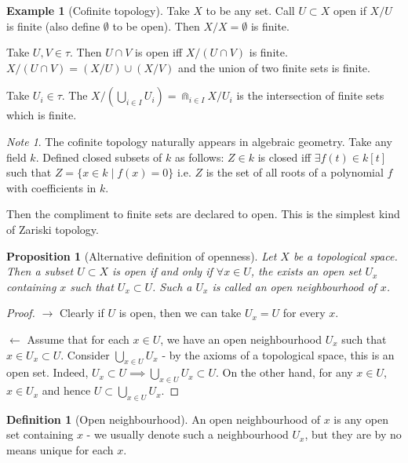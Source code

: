 \documentclass{article}
\theoremstyle{definition}
\newtheorem{defn}{Definition}[section]
\newtheorem{exmp}{Example}[section]
\theoremstyle{plain}%
\newtheorem{prop}[thm]{Proposition}
\theoremstyle{remark}
\newtheorem*{note}{Note}
\newcommand{\union}{\cup}
\newcommand{\Union}{\bigcup}
\begin{document}
\begin{exmp}[Cofinite topology]
Take $X$ to be any set. Call $U \subset X$ open if $X / U$ is finite (also define $\emptyset$ to be open). Then $X / X = \emptyset$ is finite. 

Take $U, V \in \tau$. Then $U \cap V$ is open iff $X / (U \cap V)$ is finite. $X / (U \cap V) = (X / U) \union (X / V)$ and the union of two finite sets is finite.

Take $U_i \in \tau$. The $X / (\Union_{i \in I} U_i) = \Cap_{i \in I} X / U_i$ is the intersection of finite sets which is finite.
\end{exmp}

\begin{note}
The cofinite topology naturally appears in algebraic geometry. Take any field $k$. Defined closed subsets of $k$ as follows: $Z \in k$ is closed iff $\exists f(t) \in k[t]$ such that $Z = \{x \in k \; | \; f(x) = 0\}$ i.e. $Z$ is the set of all roots of a polynomial $f$ with coefficients in $k$.

Then the compliment to finite sets are declared to open. This is the simplest kind of Zariski topology.
\end{note}

\begin{prop}[Alternative definition of openness]\label{open by open neighbourhoods}
Let $X$ be a topological space. Then a subset $U \subset X$ is open if and only if $\forall x \in U$, the exists an open set $U_x$ containing $x$ such that $U_x \subset U$. Such a $U_x$ is called an open neighbourhood of $x$.
\end{prop}

\begin{proof}
$\rightarrow$ Clearly if $U$ is open, then we can take $U_x = U$ for every $x$.

$\leftarrow$ Assume that for each $x \in U$, we have an open neighbourhood $U_x$ such that $x \in U_x \subset U$. Consider $\Union_{x \in U}U_x$ - by the axioms of a topological space, this is an open set. Indeed, $U_x \subset U \implies \Union_{x \in U}U_x \subset U$. On the other hand, for any $x \in U$, $x \in U_x$ and hence $U \subset \Union_{x \in U}U_x$.
\end{proof}

\begin{defn}[Open neighbourhood]
    An open neighbourhood of $x$ is any open set containing $x$ - we usually denote such a neighbourhood $U_x$, but they are by no means unique for each $x$.
\end{defn}
\end{document}
